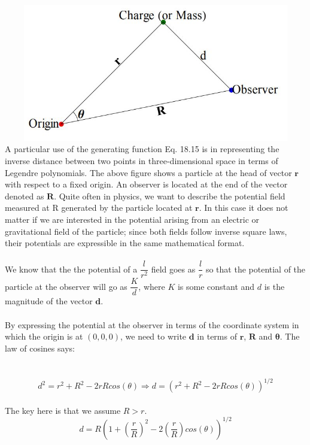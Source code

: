 \documentclass[fleqn]{article}
\begin{document}
\begin{enumerate}
    \includegraphics[height=6cm, width=15cm]{legendre.JPG}
    \textcolor{hwColor}{
      A particular use of the generating function Eq. 18.15 is in representing the inverse distance between two points 
      in three-dimensional space in terms of Legendre polynomials. The above figure shows a particle at the head of vector 
      $\mathbf{r}$ with respect to a fixed origin. An observer is located at the end of the vector denoted as $\mathbf{R}$. 
      Quite often in physics, we want to describe the potential field measured at R generated by the particle located 
      at $\mathbf{r}$. In this case it does not matter if we are interested in the potential arising from an electric or
      gravitational field of the particle; since both fields follow inverse square laws, their
      potentials are expressible in the same mathematical format. 
      \\
      \\
      We know that the the potential of a $\dfrac{l}{r^2}$ field goes as $\dfrac{l}{r}$ so that the
      potential of the particle at the observer will go as $\dfrac{K}{d}$, where $K$ is some constant and $d$ is 
      the magnitude of the vector $\mathbf{d}$. \\
      \\
      By expressing the potential at the observer in terms of the coordinate system in which the origin is at $(0,0,0)$, 
      we need to write $\mathbf{d}$ in terms of $\mathbf{r}$, $\mathbf{R}$ and $\mathbf{\theta}$. The law of cosines says: \\
      \\
      \\
      $$d^2=r^2+R^2-2rR cos(\theta) \Rightarrow d=\left(r^2+R^2-2rR cos(\theta)\right)^{1/2}$$ \\
      The key here is that we assume $R>r$. \\
      $$d=R\left(1+\left(\dfrac{r}{R}\right)^2-2 \left(\dfrac{r}{R}\right) cos(\theta)\right)^{1/2}$$
}
\end{enumerate}
\end{document}
